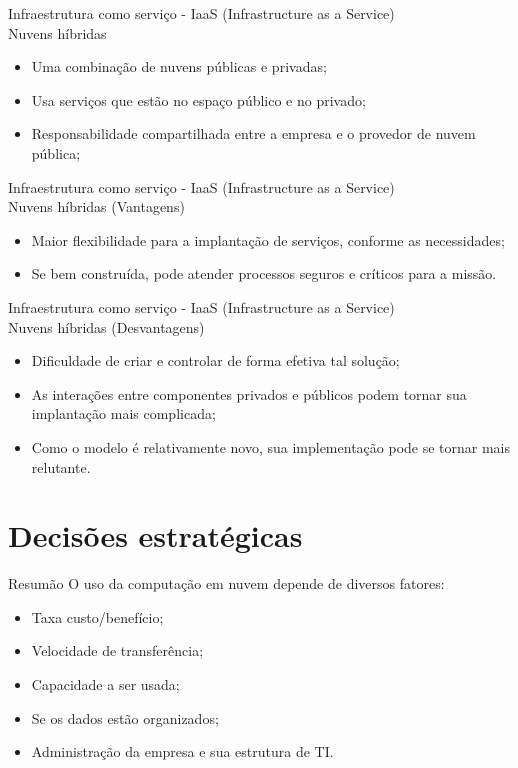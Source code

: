 \documentclass{beamer}
\begin{document}
\begin{frame}[fragile]{Infraestrutura como serviço - IaaS (Infrastructure as a Service) \\ Nuvens híbridas}\justifying
      \begin{itemize}
            \item Uma combinação de nuvens públicas e privadas;
            \item Usa serviços que estão no espaço público e no privado;
            \item Responsabilidade compartilhada entre a empresa e o provedor de nuvem pública;
      \end{itemize}
\end{frame}
\begin{frame}[fragile]{Infraestrutura como serviço - IaaS (Infrastructure as a Service) \\ Nuvens híbridas (Vantagens)}\justifying
      \begin{itemize}
            \item Maior flexibilidade para a implantação de serviços, conforme as necessidades;
            \item Se bem construída, pode atender processos seguros e críticos para a missão.
      \end{itemize}
\end{frame}
\begin{frame}[fragile]{Infraestrutura como serviço - IaaS (Infrastructure as a Service) \\ Nuvens híbridas (Desvantagens)}\justifying
      \begin{itemize}
            \item Dificuldade de criar e controlar de forma efetiva tal solução;
            \item As interações entre componentes privados e públicos podem tornar sua implantação mais complicada;
            \item Como o modelo é relativamente novo, sua implementação pode se tornar mais relutante.
      \end{itemize}
\end{frame}

\section{Decisões estratégicas}
\begin{frame}[fragile]{Resumão}\justifying
      O uso da computação em nuvem depende de diversos fatores:
      \begin{itemize}
            \item Taxa custo/benefício;
            \item Velocidade de transferência;
            \item Capacidade a ser usada;
            \item Se os dados estão organizados;
            \item Administração da empresa e sua estrutura de TI.
      \end{itemize}
\end{frame}
\end{document}
